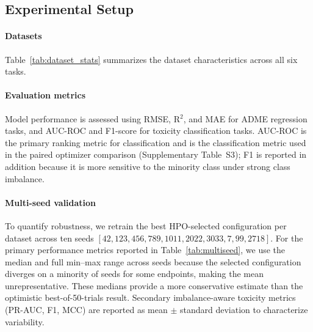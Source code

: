 \documentclass[journal]{IEEEtran}
\begin{document}
\subsection{Experimental Setup}
\label{sec:experimental_setup}

\paragraph{Datasets}
Table~\ref{tab:dataset_stats} summarizes the dataset characteristics across all six tasks.

\paragraph{Evaluation metrics}
Model performance is assessed using RMSE, R$^2$, and MAE for ADME regression tasks, and AUC-ROC and F1-score for toxicity classification tasks. AUC-ROC is the primary ranking metric for classification and is the classification metric used in the paired optimizer comparison (Supplementary Table~S3); F1 is reported in addition because it is more sensitive to the minority class under strong class imbalance.

\paragraph{Multi-seed validation}
To quantify robustness, we retrain the best HPO-selected configuration per dataset across ten seeds $[42, 123, 456, 789, 1011, 2022, 3033, 7, 99, 2718]$. For the primary performance metrics reported in Table~\ref{tab:multiseed}, we use the median and full min--max range across seeds because the selected configuration diverges on a minority of seeds for some endpoints, making the mean unrepresentative. These medians provide a more conservative estimate than the optimistic best-of-50-trials result. Secondary imbalance-aware toxicity metrics (PR-AUC, F1, MCC) are reported as mean $\pm$ standard deviation to characterize variability.
\end{document}
